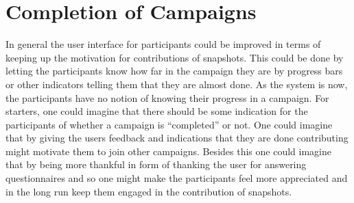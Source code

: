 
\section{Completion of Campaigns}
\label{sec:completion_of_campaigns}

In general the user interface for participants could be improved in terms of keeping up the motivation for contributions of snapshots. This could be done by letting the participants know how far in the campaign they are by progress bars or other indicators telling them that they are almost done. As the system is now, the participants have no notion of knowing their progress in a campaign. For starters, one could imagine that there should be some indication for the participants of whether a campaign is  ``completed'' or not. One could imagine that by giving the users feedback and indications that they are done contributing might motivate them to join other campaigns. Besides this one could imagine that by being more thankful in form of thanking the user for answering questionnaires and so one might make the participants feel more appreciated and in the long run keep them engaged in the contribution of snapshots.